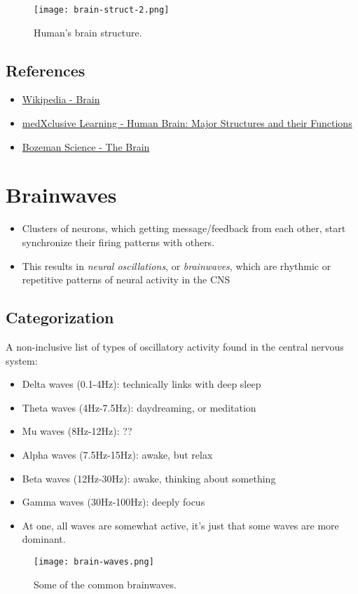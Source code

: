 \begin{figure}[hbt!]
	\centering
	\texttt{[image: brain-struct-2.png]}
	\caption{Human's brain structure.}
	\label{fig:brain-struct-2}
\end{figure}

\subsection{References}
\begin{itemize}
	\item \href{https://en.wikipedia.org/wiki/Brain}{Wikipedia - Brain}
	\item \href{https://youtu.be/EeE7Fpg061I}{medXclusive Learning - Human Brain: Major Structures and their Functions}
	\item \href{https://youtu.be/kMKc8nfPATI}{Bozeman Science - The Brain}
\end{itemize}

\section{Brainwaves}
\begin{itemize}
	\item Clusters of neurons, which getting message/feedback from each other, start synchronize their firing patterns with others.
	\item This results in \textit{neural oscillations}, or \textit{brainwaves}, which are rhythmic or repetitive patterns of neural activity in the \ac{CNS}
\end{itemize}

\subsection{Categorization}
A non-inclusive list of types of oscillatory activity found in the central nervous system:
\begin{itemize}
	\item Delta waves (0.1-4Hz): technically links with deep sleep
	\item Theta waves (4Hz-7.5Hz): daydreaming, or meditation
	\item Mu waves (8Hz-12Hz): ??
	\item Alpha waves (7.5Hz-15Hz): awake, but relax
	\item Beta waves (12Hz-30Hz): awake, thinking about something
	\item Gamma waves (30Hz-100Hz): deeply focus
	\item At one, all waves are somewhat active, it's just that some waves are more dominant.
\end{itemize}
\begin{figure}[hbt!]
	\centering
	\texttt{[image: brain-waves.png]}
	\caption{Some of the common brainwaves.}
\end{figure}

